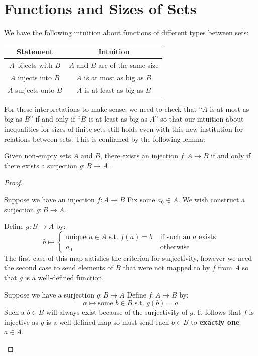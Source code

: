 \documentclass[../main.tex]{subfiles}
\begin{document}
\section{Functions and Sizes of Sets}
We have the following intuition about functions of different types between sets:
\begin{center}
\begin{tabular}{c|c}
Statement & Intuition \\
\hline
$A$ bijects with $B$ & $A$ and $B$ are of the same size \\
$A$ injects into $B$ & $A$ is at most as big as $B$ \\
$A$ surjects onto $B$ & $A$ is at least as big as $B$
\end{tabular}
\end{center}
For these interpretations to make sense, we need to check that ``$A$ is at most as big as $B$'' if and only if ``$B$ is at least as big as $A$'' so that our intuition about inequalities for sizes of finite sets still holds even with this new institution for relations between sets.
This is confirmed by the following lemma:
\begin{lemma}
  Given non-empty sets $A$ and $B$, there exists an injection $f: A \to B$ if and only if there exists a surjection $g: B \to A$.
\end{lemma}
\begin{proof}
  \begin{proofdirection}{Suppose we have an injection $f: A \to B$}
    Fix some $a_0 \in A$.
    We wish construct a surjection $g: B \to A$.

    Define $g: B \to A$ by:
    \[
      b \mapsto \begin{cases}
      \text{unique $a \in A$ s.t. $f(a) = b$} &  \text{ if such an $a$ exists} \\
      a_0 & \text{ otherwise}
     \end{cases}
    \]
    The first case of this map satisfies the criterion for surjectivity, however we need the second case to send elements of $B$ that were not mapped to by $f$ from $A$ so that $g$ is a well-defined function.
  \end{proofdirection}
  \begin{proofdirection}{Suppose we have a surjection $g: B \to A$}
    Define $f: A \to B$ by:
    \[
      a \mapsto \text{some $b \in B$ s.t. $g(b) = a$}
    \]
    Such a $b \in B$ will always exist because of the surjectivity of $g$.
    It follows that $f$ is injective as $g$ is a well-defined map so must send each $b \in B$ to \textbf{exactly one} $a \in A$.
  \end{proofdirection}
\end{proof}
\end{document}
